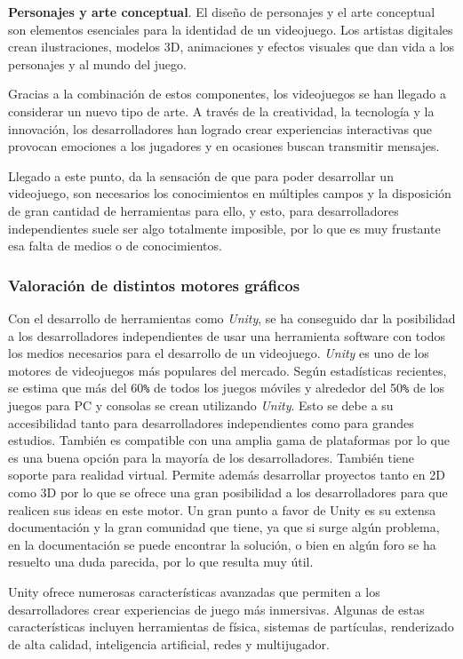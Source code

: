 \textbf{Personajes y arte conceptual}. El diseño de personajes y el arte conceptual son elementos esenciales para la identidad de un videojuego. Los artistas digitales crean ilustraciones, modelos 3D, animaciones y efectos visuales que dan vida a los personajes y al mundo del juego.

Gracias a la combinación de estos componentes, los videojuegos se han llegado a considerar un nuevo tipo de arte. A través de la creatividad, la tecnología y la innovación, los desarrolladores han logrado crear experiencias interactivas que provocan emociones a los jugadores y en ocasiones buscan transmitir mensajes.

Llegado a este punto, da la sensación de que para poder desarrollar un videojuego, son necesarios los conocimientos en múltiples campos y la disposición de gran cantidad de herramientas para ello, y esto, para desarrolladores independientes suele ser algo totalmente imposible, por lo que es muy frustante esa falta de medios o de conocimientos. 

\subsubsection{Valoración de distintos motores gráficos}

Con el desarrollo de herramientas como \textit{Unity}, se ha conseguido dar la posibilidad a los desarrolladores independientes de usar una herramienta software con todos los medios necesarios para el desarrollo de un videojuego. \textit{Unity}  es uno de los motores de videojuegos más populares del mercado. Según estadísticas recientes, se estima que más del 60\verb|%| de todos los juegos móviles y alrededor del 50\verb|%| de los juegos para PC y consolas se crean utilizando \textit{Unity}. Esto se debe a su accesibilidad tanto para desarrolladores independientes como para grandes estudios. También es compatible con una amplia gama de plataformas por lo que es una buena opción para la mayoría de los desarrolladores. También tiene soporte para realidad virtual. Permite además desarrollar proyectos tanto en 2D como 3D por lo que se ofrece una gran posibilidad a los desarrolladores para que realicen sus ideas en este motor. Un gran punto a favor de Unity es su extensa documentación y la gran comunidad que tiene, ya que si surge algún problema, en la documentación se puede encontrar la solución, o bien en algún foro se ha resuelto una duda parecida, por lo que resulta muy útil.

Unity ofrece numerosas características avanzadas que permiten a los desarrolladores crear experiencias de juego más inmersivas. Algunas de estas características incluyen herramientas de física, sistemas de partículas, renderizado de alta calidad, inteligencia artificial, redes y multijugador.


